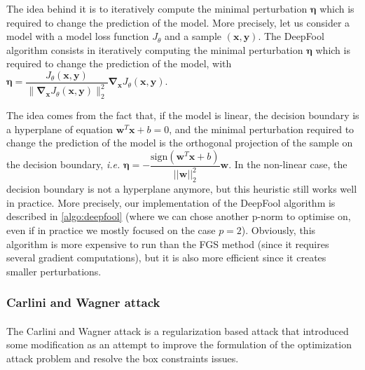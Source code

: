 \documentclass[11pt,twocolumn,letterpaper]{article}
\begin{document}
The idea behind it is to iteratively compute the minimal perturbation $\bm{\eta}$ which is required to change the prediction of the model. More precisely, let us consider a model with a model loss function $J_{\theta}$ and a sample $(\bm{x}, \bm{y})$. The DeepFool algorithm consists in iteratively computing the minimal perturbation $\bm{\eta}$ which is required to change the prediction of the model, with $\bm{\eta} = \dfrac{J_{\theta}(\bm{x}, \bm{y})}{\|\bm{\nabla}_{\bm{x}} J_{\theta}(\bm{x}, \bm{y})\|_2^2} \bm{\nabla}_{\bm{x}} J_{\theta}(\bm{x}, \bm{y})$. 

The idea comes from the fact that, if the model is linear, the decision boundary is a hyperplane of equation $\bm{w}^T\bm{x} + b = 0$, and the minimal perturbation required to change the prediction of the model is the orthogonal projection of the sample on the decision boundary, \textit{i.e.} $\bm{\eta} = - \dfrac{\text{sign}(\bm{w}^T\bm{x} + b)}{||\bm{w}||_2^2} \bm{w}$. In the non-linear case, the decision boundary is not a hyperplane anymore, but this heuristic still works well in practice. More precisely, our implementation of the DeepFool algorithm is described in \ref{algo:deepfool} (where we can chose another p-norm to optimise on, even if in practice we mostly focused on the case $p=2$).
Obviously, this algorithm is more expensive to run than the FGS method (since it requires several gradient computations), but it is also more efficient since it creates smaller perturbations.

\subsubsection{Carlini and Wagner attack}
\paragraph{}
The Carlini and Wagner attack \cite{robustness}is a regularization based attack that introduced some modification as an attempt to improve the formulation of the optimization attack problem and resolve the box constraints issues.
\end{document}
